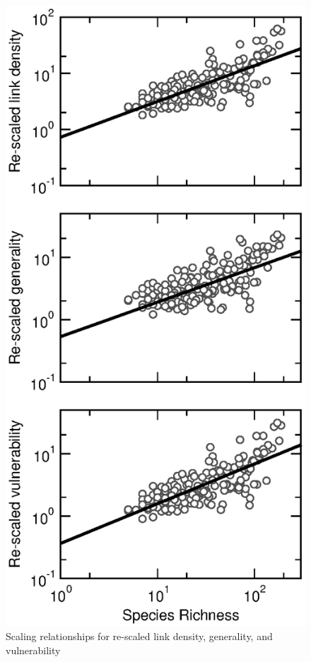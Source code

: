 \documentclass[12pt]{article}
\providecommand{\DIFaddendFL}{} %
\begin{document}
\begin{figure}[h]
\centerline{\includegraphics*[height=.5\textheight]{Figures/by_TL/scaling_with_S/proportions/S_fitlines_nonts.eps}}
\DIFaddendFL \caption{Scaling relationships for re-scaled link density, generality, and vulnerability 
}
\end{figure}
\end{document}
